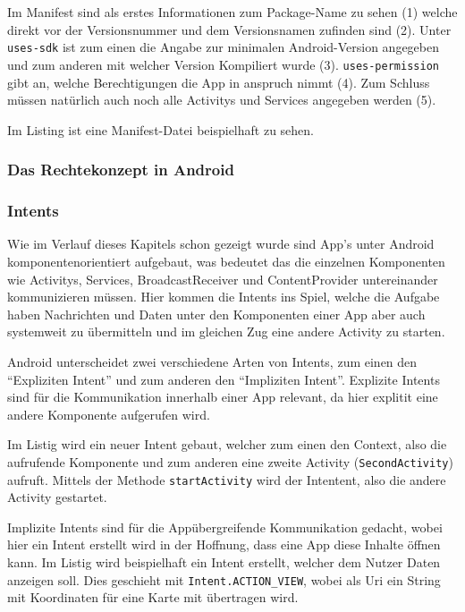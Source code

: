 Im Manifest sind als erstes Informationen zum Package-Name zu sehen (1) welche direkt vor der Versionsnummer und dem Versionsnamen zufinden sind (2). Unter \texttt{uses-sdk} ist zum einen die Angabe zur minimalen Android-Version angegeben und zum anderen mit welcher Version Kompiliert wurde (3). \texttt{uses-permission} gibt an, welche Berechtigungen die App in anspruch nimmt (4). Zum Schluss m\"ussen nat\"urlich auch noch alle Activitys und Services angegeben werden (5).
\cite{Android44}

Im Listing ist eine Manifest-Datei beispielhaft zu sehen.



\subsubsection{Das Rechtekonzept in Android}

\subsubsection{Intents} \label{Intents}
Wie im Verlauf dieses Kapitels schon gezeigt wurde sind App's unter Android komponentenorientiert aufgebaut, was bedeutet das die einzelnen Komponenten wie Activitys, Services, BroadcastReceiver und ContentProvider untereinander kommunizieren m\"ussen. Hier kommen die Intents ins Spiel, welche die Aufgabe haben Nachrichten und Daten unter den Komponenten einer App aber auch systemweit zu \"ubermitteln und im gleichen Zug eine andere Activity zu starten.

Android unterscheidet zwei verschiedene Arten von Intents, zum einen den "`Expliziten Intent"' und zum anderen den "`Impliziten Intent"'. Explizite Intents sind f\"ur die Kommunikation innerhalb einer App relevant, da hier explitit eine andere Komponente aufgerufen wird. 

Im Listig wird ein neuer Intent gebaut, welcher zum einen den Context, also die aufrufende Komponente und zum anderen eine zweite Activity (\texttt{SecondActivity}) aufruft. Mittels der Methode \texttt{startActivity} wird der Intentent, also die andere Activity gestartet.



Implizite Intents sind f\"ur die App\"ubergreifende Kommunikation gedacht, wobei hier ein Intent erstellt wird in der Hoffnung, dass eine App diese Inhalte \"offnen kann.
Im Listig wird beispielhaft ein Intent erstellt, welcher dem Nutzer Daten anzeigen soll. Dies geschieht mit \texttt{Intent.ACTION\_VIEW}, wobei als Uri ein String mit Koordinaten f\"ur eine Karte mit \"ubertragen wird.

